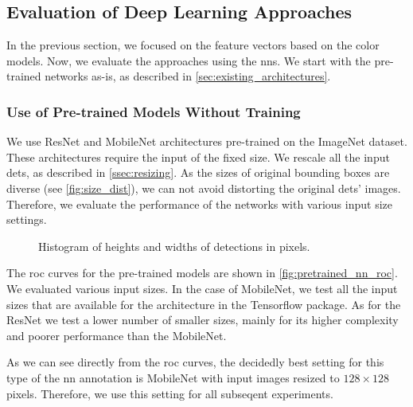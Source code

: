 \subsection{Evaluation of Deep Learning Approaches}

In the previous section, we focused on the feature vectors based on the color models. Now, we evaluate the approaches using the \glspl{nn}. We start with the pre-trained networks as-is, as described in \autoref{sec:existing_architectures}.

\subsubsection{Use of Pre-trained Models Without Training}


We use ResNet and MobileNet architectures
pre-trained on the ImageNet dataset. These architectures
require the input of the fixed size. We rescale all the input \glspl{det}, as described in \autoref{ssec:resizing}. As the sizes of original bounding boxes are diverse (see
\autoref{fig:size_dist}), we can not avoid distorting the original \glspl{det}' images.
Therefore, we evaluate the performance of the networks with various input size settings.

\begin{figure}
    \centering
    \def\svgwidth{\columnwidth}
    
    \caption{Histogram of heights and widths of detections in pixels.}
    \label{fig:size_dist}
\end{figure}

The \gls{roc} curves for the pre-trained models are shown in \autoref{fig:pretrained_nn_roc}.
We evaluated various input sizes. In the case of MobileNet, we test
all the input sizes that are available for the architecture in the Tensorflow package. As for the 
ResNet we test a lower number of smaller sizes, mainly for its higher
complexity and poorer performance than the MobileNet.

As we can see directly from the \gls{roc} curves, the decidedly best setting for this type of the \gls{nn} annotation is MobileNet with input images resized to $128 \times 128$ pixels. Therefore, we use this setting for all subseqent experiments.

